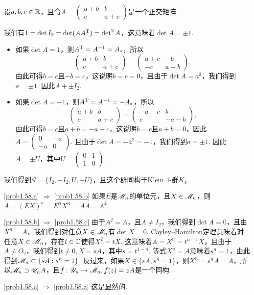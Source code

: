 \begin{solution}
  设$a,b,c\in\mathbb R$，且令$A=\begin{pmatrix}
    a + b & b \\
    c & a + c
  \end{pmatrix}$是一个正交矩阵.

  我们有$1=\det I_2=\det(AA^{\mathrm T})=\det\nolimits^2A$，这意味着$\det A=\pm1$.
  \begin{itemize}
    \item 如果$\det A=1$，则$A^{\mathrm T}=A^{-1}=A_\ast$，所以
    \[
      \begin{pmatrix}
        a + b & b \\
        c & a + c
      \end{pmatrix} =
      \begin{pmatrix}
        a + c & -b \\
        -c & a + b
      \end{pmatrix},
    \]
    由此可得$b=c$且$-b=c$，这说明$b=c=0$，且由于$\det A=a^2$，我们得到$a=\pm1$. 因此$A+\pm I_2$.
    \item 如果$\det A=-1$，则$A^{\mathrm T}=A^{-1}=-A_\ast$，所以
    \[
      \begin{pmatrix}
        a + b & b \\
        c & a + c
      \end{pmatrix} =
      \begin{pmatrix}
        -a - c & b \\
        c & -a - b
      \end{pmatrix},
    \]
    由此可得$b=c$且$a+b=-a-c$，这说明$b=c$且$a+b=0$，因此$A=\begin{pmatrix}
      0 & -a \\
      -a & 0
    \end{pmatrix}$. 且由于$\det A=-a^2=-1$，我们得到$a=\pm1$. 因此$A=\pm U$，其中$U=\begin{pmatrix}
      0 & 1 \\
      1 & 0
    \end{pmatrix}$.
  \end{itemize}

  我们得到$\mathscr G=\{I_2,-I_2,U,-U\}$，且这个群同构于Klein 4-群$K_4$.
\end{solution}

\begin{solution}
  \ref{prob1.58.a} $\Rightarrow$ \ref{prob1.58.b} 如果$E$是$\mathscr M_n$的单位元，且$X\in\mathscr M_n$，则$A=(EX)^n=E^nX^n=AA=A^2$.

  \ref{prob1.58.b} $\Rightarrow$ \ref{prob1.58.c} 由于$A^2=A$，且$A\ne I_2$，我们得到$\det A=0$，且由$X^n=A$，我们得到对任意$X\in\mathscr M_n$有$\det X=0$. Cayley--Hamilton定理意味着对任意$X\in\mathscr M_n$，存在$t\in\mathbb C$使得$X^2=tX$. 这意味着$A=X^n=t^{n-1}X$，且由于$A\ne O_2$，我们得到$t\ne0,X=sA$，其中$s=t^{1-n}$. 等式$X^n=A$意味着$s^n=1$，由此得到$\mathscr M_n\subset\{sA:s^n=1\}$.  反过来，如果$X\in\{sA,s^n=1\}$，则$X^n=s^nA=A$，所以$\mathscr M_n\supset\mathscr U_nA$，且$f:\mathscr U_n\to\mathscr M_n,f(z)=zA$是一个同构.

  \ref{prob1.58.c} $\Rightarrow$ \ref{prob1.58.a} 这是显然的.
\end{solution}

